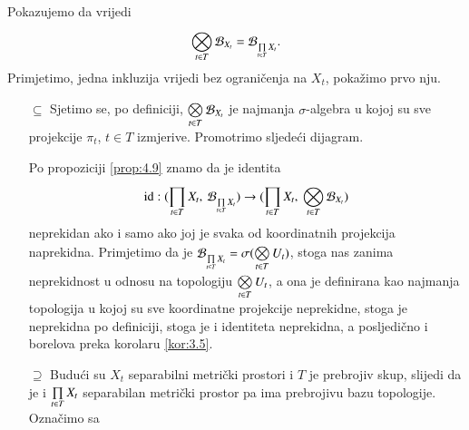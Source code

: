 \begin{rj}[\ref{zad:4.4}]
    Pokazujemo da vrijedi
    \begin{equation*}
        \bigotimes\limits_{t \in T}^{} \mathcal{B}_{X_t} = \mathcal{B}_{\prod\limits_{t \in T}^{} X_t}.
    \end{equation*}
    Primjetimo, jedna inkluzija vrijedi bez ograni\v cenja na $X_t$, poka\v zimo prvo nju.
    \begin{enumerate}
        \item[$\subseteq$]
        Sjetimo se, po definiciji, $\bigotimes\limits_{t \in T}^{} \mathcal{B}_{X_t}$ je najmanja $\sigma$-algebra u kojoj su sve projekcije $\pi_t$, $t \in T$ izmjerive.
        Promotrimo sljede\' ci dijagram.
        \begin{figure}[H]
            \centering
        \end{figure}
        Po propoziciji \ref{prop:4.9} znamo da je identita
        \begin{equation*}
            \mathrm{id} : ({\prod\limits_{t \in T}^{} X_t}, \: {\mathcal{B}_{\prod\limits_{t \in T}^{} X_t}}) \to ({\prod\limits_{t \in T}^{} X_t}, \: {\bigotimes\limits_{t \in T}^{} \mathcal{B}_{X_t}})
        \end{equation*}
        neprekidan ako i samo ako joj je svaka od koordinatnih projekcija naprekidna.
        Primjetimo da je $\mathcal{B}_{\prod\limits_{t \in T}^{} X_t} = \sigma({\bigotimes\limits_{t \in T}^{} U_t})$, stoga nas zanima neprekidnost u odnosu na topologiju $\bigotimes\limits_{t \in T}^{} U_t$, a ona je definirana kao najmanja topologija u kojoj su sve koordinatne projekcije neprekidne, stoga je neprekidna po definiciji, stoga je i identiteta neprekidna, a posljedi\v cno i borelova preka korolaru \ref{kor:3.5}.
        \item[$\supseteq$]
        Budu\' ci su $X_t$ separabilni metri\v cki prostori i $T$ je prebrojiv skup, slijedi da je i $\prod\limits_{t \in T}^{} X_t$ separabilan metri\v cki prostor pa ima prebrojivu bazu topologije. Ozna\v cimo sa

\end{enumerate}
\end{rj}
